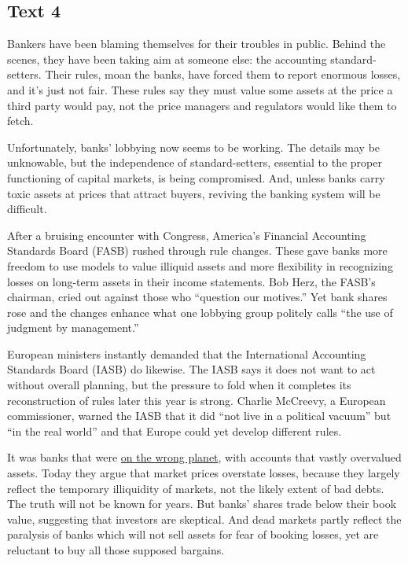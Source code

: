 \documentclass[UTF8,11pt]{ctexart}
\begin{document}
\subsection*{\textbf{Text 4}}


Bankers have been blaming themselves for their troubles in public. Behind the scenes, they have been taking aim at someone else: the accounting standard-setters. Their rules, moan the banks, have forced them to report enormous losses, and it’s just not fair. These rules say they must value some assets at the price a third party would pay, not the price managers and regulators would like them to fetch.


Unfortunately, banks’ lobbying now seems to be working. The details may be unknowable, but the independence of standard-setters, essential to the proper functioning of capital markets, is being compromised. And, unless banks carry toxic assets at prices that attract buyers, reviving the banking system will be difficult.


After a bruising encounter with Congress, America’s Financial Accounting Standards Board (FASB) rushed through rule changes. These gave banks more freedom to use models to value illiquid assets and more flexibility in recognizing losses on long-term assets in their income statements. Bob Herz, the FASB’s chairman, cried out against those who “question our motives.” Yet bank shares rose and the changes enhance what one lobbying group politely calls “the use of judgment by management.”


European ministers instantly demanded that the International Accounting Standards Board (IASB) do likewise. The IASB says it does not want to act without overall planning, but the pressure to fold when it completes its reconstruction of rules later this year is strong. Charlie McCreevy, a European commissioner, warned the IASB that it did “not live in a political vacuum” but “in the real world” and that Europe could yet develop different rules.


It was banks that were \uline{on the wrong planet}, with accounts that vastly overvalued assets. Today they argue that market prices overstate losses, because they largely reflect the temporary illiquidity of markets, not the likely extent of bad debts. The truth will not be known for years. But banks’ shares trade below their book value, suggesting that investors are skeptical. And dead markets partly reflect the paralysis of banks which will not sell assets for fear of booking losses, yet are reluctant to buy all those supposed bargains.
\end{document}
